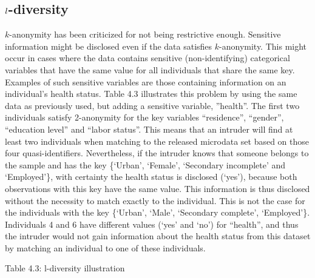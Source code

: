 \documentclass[letterpaper,10pt,english]{sphinxmanual}
\begin{document}
\subsection{\protect\(l\protect\)-diversity}
\label{\detokenize{measure_risk:diversity}}
\(k\)-anonymity has been criticized for not being restrictive
enough. Sensitive information might be disclosed even if the data
satisfies \(k\)-anonymity. This might occur in cases where the data
contains sensitive (non-identifying) categorical variables that have the
same value for all individuals that share the same key. Examples of such
sensitive variables are those containing information on an individual’s
health status. Table 4.3 illustrates this problem by using the same data
as previously used, but adding a sensitive variable, ”health”. The first
two individuals satisfy 2-anonymity for the key variables “residence”,
“gender”, “education level” and “labor status”. This means that an
intruder will find at least two individuals when matching to the
released microdata set based on those four quasi-identifiers.
Nevertheless, if the intruder knows that someone belongs to the sample
and has the key \{‘Urban’, ‘Female’, ‘Secondary incomplete’ and
‘Employed’\}, with certainty the health status is disclosed (‘yes’),
because both observations with this key have the same value. This
information is thus disclosed without the necessity to match exactly to
the individual. This is not the case for the individuals with the key
\{‘Urban’, ‘Male’, ‘Secondary complete’, ‘Employed’\}. Individuals 4 and 6
have different values (‘yes’ and ‘no’) for “health”, and thus the
intruder would not gain information about the health status from this
dataset by matching an individual to one of these individuals.

Table 4.3: l-diversity illustration
\end{document}
